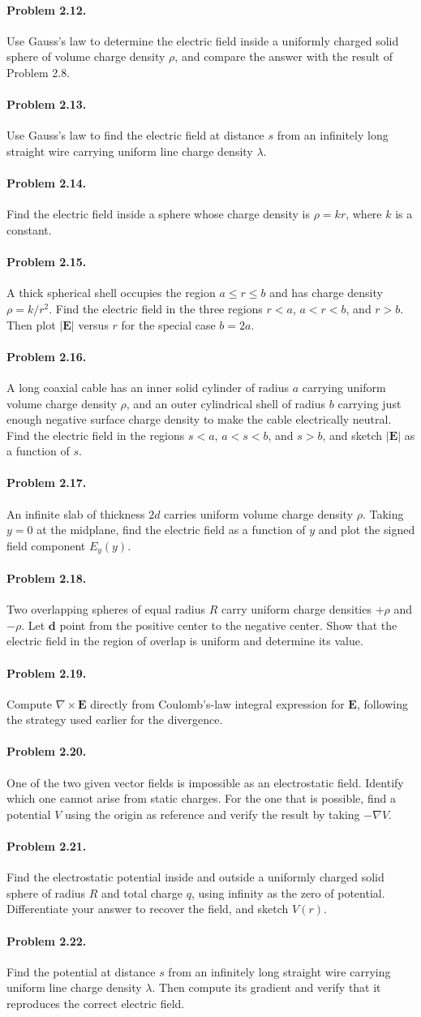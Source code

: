 \documentclass{aa}
\newcommand{\problemstatement}[2]{%
\paragraph{Problem #1.}#2\par\medskip
}
\begin{document}
\problemstatement{2.12}{Use Gauss's law to determine the electric field inside a uniformly charged solid sphere of volume charge density \(\rho\), and compare the answer with the result of Problem 2.8.}
\problemstatement{2.13}{Use Gauss's law to find the electric field at distance \(s\) from an infinitely long straight wire carrying uniform line charge density \(\lambda\).}
\problemstatement{2.14}{Find the electric field inside a sphere whose charge density is \(\rho=kr\), where \(k\) is a constant.}
\problemstatement{2.15}{A thick spherical shell occupies the region \(a\le r\le b\) and has charge density \(\rho = k/r^2\). Find the electric field in the three regions \(r<a\), \(a<r<b\), and \(r>b\). Then plot \(|\mathbf E|\) versus \(r\) for the special case \(b=2a\).}
\problemstatement{2.16}{A long coaxial cable has an inner solid cylinder of radius \(a\) carrying uniform volume charge density \(\rho\), and an outer cylindrical shell of radius \(b\) carrying just enough negative surface charge density to make the cable electrically neutral. Find the electric field in the regions \(s<a\), \(a<s<b\), and \(s>b\), and sketch \(|\mathbf E|\) as a function of \(s\).}
\problemstatement{2.17}{An infinite slab of thickness \(2d\) carries uniform volume charge density \(\rho\). Taking \(y=0\) at the midplane, find the electric field as a function of \(y\) and plot the signed field component \(E_y(y)\).}
\problemstatement{2.18}{Two overlapping spheres of equal radius \(R\) carry uniform charge densities \(+\rho\) and \(-\rho\). Let \(\mathbf d\) point from the positive center to the negative center. Show that the electric field in the region of overlap is uniform and determine its value.}
\problemstatement{2.19}{Compute \(\nabla\times\mathbf E\) directly from Coulomb's-law integral expression for \(\mathbf E\), following the strategy used earlier for the divergence.}
\problemstatement{2.20}{One of the two given vector fields is impossible as an electrostatic field. Identify which one cannot arise from static charges. For the one that is possible, find a potential \(V\) using the origin as reference and verify the result by taking \(-\nabla V\).}
\problemstatement{2.21}{Find the electrostatic potential inside and outside a uniformly charged solid sphere of radius \(R\) and total charge \(q\), using infinity as the zero of potential. Differentiate your answer to recover the field, and sketch \(V(r)\).}
\problemstatement{2.22}{Find the potential at distance \(s\) from an infinitely long straight wire carrying uniform line charge density \(\lambda\). Then compute its gradient and verify that it reproduces the correct electric field.}
\end{document}
